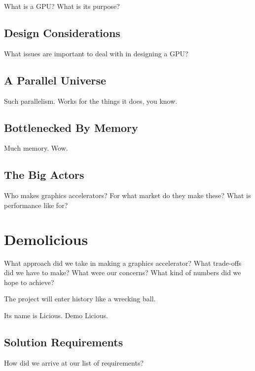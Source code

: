 \documentclass[../main/report.tex]{subfiles}
\begin{document}
What is a GPU?
What is its purpose?

\subsection{Design Considerations}

What issues are important to deal with in designing a GPU?

\subsection{A Parallel Universe}

Such parallelism. Works for the things it does, you know.

\subsection{Bottlenecked By Memory}

Much memory. Wow.

\subsection{The Big Actors}

Who makes graphics accelerators?
For what market do they make these?
What is performance like for?

\section{Demolicious}

What approach did we take in making a graphics accelerator?
What trade-offs did we have to make?
What were our concerns?
What kind of numbers did we hope to achieve?

The project will enter history like a wrecking ball.

Its name is Licious. Demo Licious.

\subsection{Solution Requirements}

How did we arrive at our list of requirements?
\end{document}
